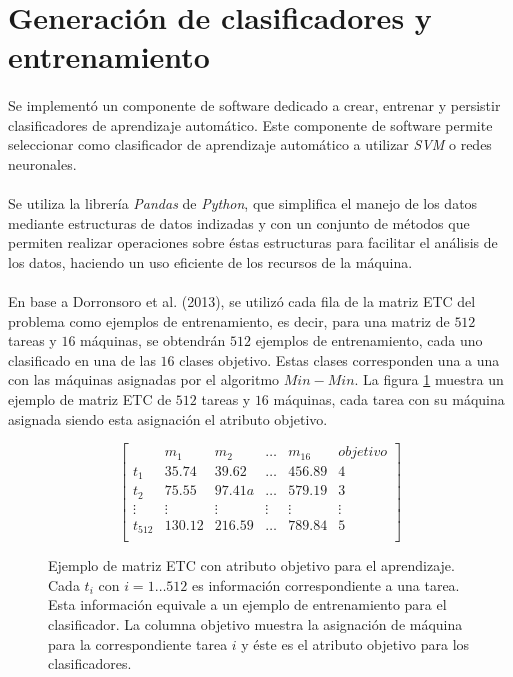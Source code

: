 \section{Generación de clasificadores y entrenamiento}

\paragraph{} Se implementó un componente de software dedicado a crear, entrenar y persistir clasificadores de aprendizaje automático. Este componente de software permite seleccionar como clasificador de aprendizaje automático a utilizar \textit{SVM} o redes neuronales.

\paragraph{} Se utiliza la librería \textit{Pandas}\citet{bib-pandas} de \textit{Python}, que simplifica el manejo de los datos mediante estructuras de datos indizadas y con un conjunto de métodos que permiten realizar operaciones sobre éstas estructuras para facilitar el análisis de los datos, haciendo un uso eficiente de los recursos de la máquina.

\paragraph{} En base a Dorronsoro et al. (2013), se utilizó cada fila de la matriz ETC del problema como ejemplos de entrenamiento, es decir, para una matriz de $512$ tareas y $16$ máquinas, se obtendrán $512$ ejemplos de entrenamiento, cada uno clasificado en una de las $16$ clases objetivo. Estas clases corresponden una a una con las máquinas asignadas por el algoritmo $Min-Min$. La figura \ref{table:datosentrenamiento} muestra un ejemplo de matriz ETC de $512$ tareas y $16$ máquinas, cada tarea con su máquina asignada siendo esta asignación el atributo objetivo.

\begin{figure}[ht!]
\[
\begin{bmatrix}
     & m_1 & m_2 & \dots  & m_{16} & objetivo \\
    t_1 & 35.74 & 39.62 & \dots  & 456.89 & 4 \\
    t_2 & 75.55 & 97.41a & \dots  & 579.19 & 3 \\
    \vdots & \vdots & \vdots & \vdots & \vdots & \vdots\\
    t_{512} & 130.12 & 216.59 & \dots  & 789.84 & 5\\
\end{bmatrix}
\]
\caption{Ejemplo de matriz ETC con atributo objetivo para el aprendizaje. Cada $t_i$ con $i = 1 \dots 512$ es información correspondiente a una tarea. Esta información equivale a un ejemplo de entrenamiento para el clasificador. La columna objetivo muestra la asignación de máquina para la correspondiente tarea $i$ y éste es el atributo objetivo para los clasificadores.}
\label{table:datosentrenamiento}
\end{figure}

